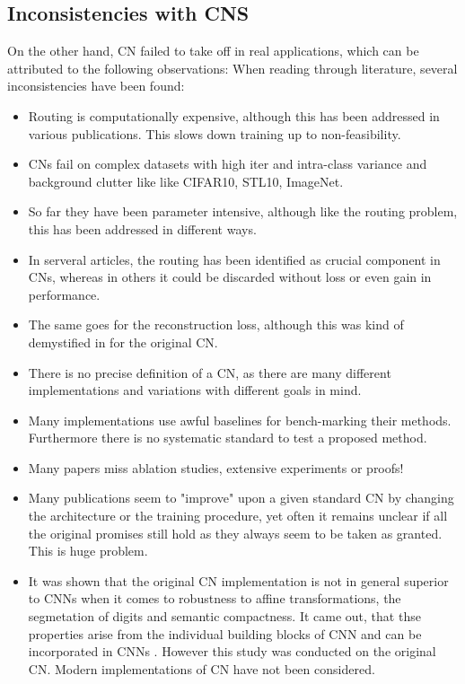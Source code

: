 \documentclass{article}
\begin{document}
\subsection{Inconsistencies with CNS}
On the other hand, CN failed to take off in real applications, which can be attributed to the following observations:
When reading through literature, several inconsistencies have been found:
\begin{itemize}
	\item Routing is computationally expensive, although this has been addressed in various publications. This slows down training up to non-feasibility.
	\item CNs fail on complex datasets with high iter and intra-class variance and background clutter like like CIFAR10, STL10, ImageNet.
	\item So far they have been parameter intensive, although like the routing problem, this has been addressed in different ways.
	\item In serveral articles, the routing has been identified as crucial component in CNs, whereas in others it could be discarded without loss or even gain in performance.
	\item The same goes for the reconstruction loss, although this was kind of demystified in \cite{DBLP:conf/cvpr/GuT021} for the original CN.
	\item There is no precise definition of a CN, as there are many different implementations and variations with different goals in mind.
	\item Many implementations use awful baselines for bench-marking their methods. Furthermore there is no systematic standard to test a  proposed method.
	\item Many papers miss ablation studies, extensive experiments or proofs!
	\item Many publications seem to "improve" upon a given standard CN by changing the architecture or the training procedure, yet often it remains unclear if all the original promises still hold as they always seem to be taken as granted. This is huge problem. 
	\item It was shown that the original CN implementation is not in general superior to CNNs when it comes to robustness to affine transformations, the segmetation of digits and semantic compactness. It came out, that thse properties arise from the individual building blocks of CNN and can be incorporated in CNNs \cite{DBLP:conf/cvpr/GuT021}. However this study was conducted on the original CN. Modern implementations of CN have not been considered.
\end{itemize}
\end{document}
